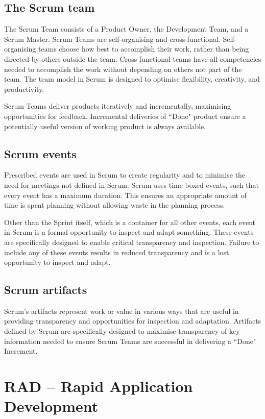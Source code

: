 \subsection{The Scrum team}

The Scrum Team consists of a Product Owner, the Development Team, and a Scrum Master. Scrum Teams are self-organising and cross-functional. Self-organising teams choose how best to accomplish their work, rather than being directed by others outside the team. Cross-functional teams have all competencies needed to accomplish the work without depending on others not part of the team. The team model in Scrum is designed to optimise flexibility, creativity, and productivity.

Scrum Teams deliver products iteratively and incrementally, maximising opportunities for feedback. Incremental deliveries of ``Done" product ensure a potentially useful version of 
working product is always available.

\subsection{Scrum events}

Prescribed events are used in Scrum to create regularity and to minimise the need for meetings not defined in Scrum. Scrum uses time-boxed events, such that every event has a maximum duration. This ensures an appropriate amount of time is spent planning without allowing waste in the planning process.

Other than the Sprint itself, which is a container for all other events, each event in Scrum is a formal opportunity to inspect and adapt something. These events are specifically designed to enable critical transparency and inspection. Failure to include any of these events results in reduced transparency and is a lost opportunity to inspect and adapt.

\subsection{Scrum artifacts}

Scrum’s artifacts represent work or value in various ways that are useful in providing transparency and opportunities for inspection and adaptation. Artifacts defined by Scrum are specifically designed to maximise transparency of key information needed to ensure Scrum Teams are successful in delivering a ``Done" Increment.

\section{RAD -- Rapid Application Development}

